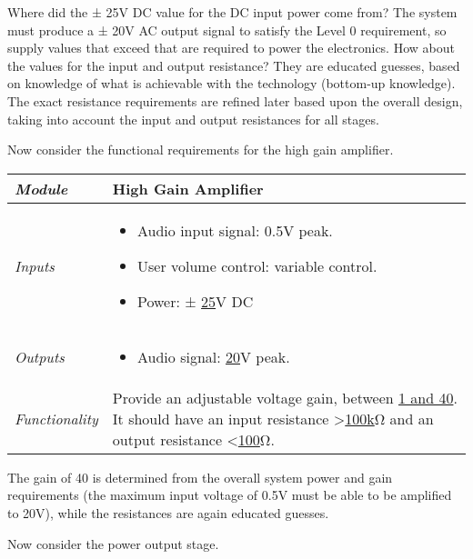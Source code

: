 Where did the ± 25V DC value for the DC input power come from? The
system must produce a ± 20V AC output signal to satisfy the Level 0
requirement, so supply values that exceed that are required to power the
electronics. How about the values for the input and output resistance?
They are educated guesses, based on knowledge of what is achievable with
the technology (bottom-up knowledge). The exact resistance requirements
are refined later based upon the overall design, taking into account the
input and output resistances for all stages.

Now consider the functional requirements for the high gain amplifier.

\begin{table}
\label{table:level1HighGainAmp}
\begin{tabular}{|l|m{10cm}|}
\hline
\emph{Module} &
High Gain Amplifier \\ \hline

\emph{Inputs} & 
\begin{itemize}
\item
  Audio input signal: 0.5V peak.
\item
  User volume control: variable control.
\item
  Power: ± \ul{25}V DC
\end{itemize}\\ \hline

\emph{Outputs} & 
\begin{itemize}
\item
  Audio signal: \ul{20}V peak.
\end{itemize} \\ \hline
\emph{Functionality} & Provide an adjustable voltage gain, between \ul{1
and 40}. It should have an input resistance \textgreater{}\ul{100k}Ω and
an output resistance \textless{}\ul{100}Ω. \\ \hline
\end{tabular}
\end{table}

The gain of 40 is determined from the overall system power and gain
requirements (the maximum input voltage of 0.5V must be able to be
amplified to 20V), while the resistances are again educated guesses.

Now consider the power output stage.

